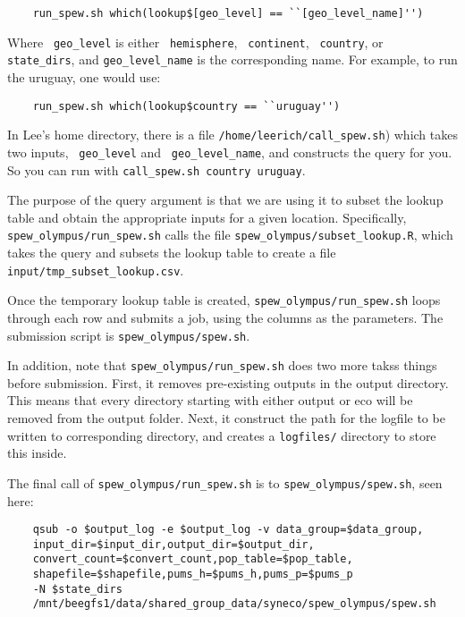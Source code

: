 \documentclass{article}
\begin{document}
\begin{verbatim} 
	run_spew.sh which(lookup$[geo_level] == ``[geo_level_name]'')
\end{verbatim}

Where \verb| geo_level| is either \verb| hemisphere|, \verb| continent|, \verb| country|, or \verb| state_dirs|, and \verb|geo_level_name| is the corresponding name. For example, to run the uruguay, one would use:

\begin{verbatim} 
	run_spew.sh which(lookup$country == ``uruguay'')
\end{verbatim}

In Lee's home directory, there is a file \verb|/home/leerich/call_spew.sh|) which takes two inputs, \verb| geo_level| and \verb| geo_level_name|, and constructs the query for you. So you can run with \verb|call_spew.sh country uruguay|. 

The purpose of the query argument is that we are using it to subset the lookup table and obtain the appropriate inputs for a given location. Specifically, \verb|spew_olympus/run_spew.sh| calls the file \verb|spew_olympus/subset_lookup.R|, which takes the query and subsets the lookup table to create a file \verb|input/tmp_subset_lookup.csv|. 

Once the temporary lookup table is created, \verb|spew_olympus/run_spew.sh| loops through each row and submits a job, using the columns as the parameters. The submission script is \verb|spew_olympus/spew.sh|. 

In addition, note that \verb|spew_olympus/run_spew.sh| does two more takss things before submission. First, it removes pre-existing outputs in the output directory. This means that every directory starting with either output or eco will be removed from the output folder. Next, it construct the path for the logfile to be written to corresponding directory, and creates a \verb|logfiles/| directory to store this inside.

The final call of \verb|spew_olympus/run_spew.sh| is to \verb|spew_olympus/spew.sh|, seen here:

\begin{verbatim}
	qsub -o $output_log -e $output_log -v data_group=$data_group,
	input_dir=$input_dir,output_dir=$output_dir,
	convert_count=$convert_count,pop_table=$pop_table,
	shapefile=$shapefile,pums_h=$pums_h,pums_p=$pums_p 
	-N $state_dirs 
	/mnt/beegfs1/data/shared_group_data/syneco/spew_olympus/spew.sh
\end{verbatim}	
\end{document}
